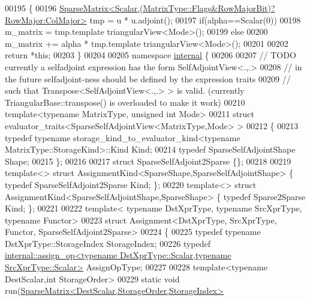 \begin{DoxyCode}
00195 \{
00196   \hyperlink{group___sparse_core___module_class_eigen_1_1_sparse_matrix}{SparseMatrix<Scalar,(MatrixType::Flags&RowMajorBit)?RowMajor:ColMajor>}
       tmp = u * u.adjoint();
00197   \textcolor{keywordflow}{if}(alpha==Scalar(0))
00198     m\_matrix = tmp.template triangularView<Mode>();
00199   \textcolor{keywordflow}{else}
00200     m\_matrix += alpha * tmp.template triangularView<Mode>();
00201 
00202   \textcolor{keywordflow}{return} *\textcolor{keyword}{this};
00203 \}
00204 
00205 \textcolor{keyword}{namespace }\hyperlink{namespaceinternal}{internal} \{
00206   
00207 \textcolor{comment}{// TODO currently a selfadjoint expression has the form SelfAdjointView<.,.>}
00208 \textcolor{comment}{//      in the future selfadjoint-ness should be defined by the expression traits}
00209 \textcolor{comment}{//      such that Transpose<SelfAdjointView<.,.> > is valid. (currently TriangularBase::transpose() is
       overloaded to make it work)}
00210 \textcolor{keyword}{template}<\textcolor{keyword}{typename} MatrixType, \textcolor{keywordtype}{unsigned} \textcolor{keywordtype}{int} Mode>
00211 \textcolor{keyword}{struct }evaluator\_traits<SparseSelfAdjointView<MatrixType,Mode> >
00212 \{
00213   \textcolor{keyword}{typedef} \textcolor{keyword}{typename} storage\_kind\_to\_evaluator\_kind<typename MatrixType::StorageKind>::Kind Kind;
00214   \textcolor{keyword}{typedef} SparseSelfAdjointShape Shape;
00215 \};
00216 
00217 \textcolor{keyword}{struct }SparseSelfAdjoint2Sparse \{\};
00218 
00219 \textcolor{keyword}{template}<> \textcolor{keyword}{struct }AssignmentKind<SparseShape,SparseSelfAdjointShape> \{ \textcolor{keyword}{typedef} SparseSelfAdjoint2Sparse 
      Kind; \};
00220 \textcolor{keyword}{template}<> \textcolor{keyword}{struct }AssignmentKind<SparseSelfAdjointShape,SparseShape> \{ \textcolor{keyword}{typedef} Sparse2Sparse Kind; \};
00221 
00222 \textcolor{keyword}{template}< \textcolor{keyword}{typename} DstXprType, \textcolor{keyword}{typename} SrcXprType, \textcolor{keyword}{typename} Functor>
00223 \textcolor{keyword}{struct }Assignment<DstXprType, SrcXprType, Functor, SparseSelfAdjoint2Sparse>
00224 \{
00225   \textcolor{keyword}{typedef} \textcolor{keyword}{typename} DstXprType::StorageIndex StorageIndex;
00226   \textcolor{keyword}{typedef} 
      \hyperlink{struct_eigen_1_1internal_1_1assign__op}{internal::assign\_op<typename DstXprType::Scalar,typename SrcXprType::Scalar>}
       AssignOpType;
00227 
00228   \textcolor{keyword}{template}<\textcolor{keyword}{typename} DestScalar,\textcolor{keywordtype}{int} StorageOrder>
00229   \textcolor{keyword}{static} \textcolor{keywordtype}{void} run(\hyperlink{group___sparse_core___module_class_eigen_1_1_sparse_matrix}{SparseMatrix<DestScalar,StorageOrder,StorageIndex>}

\end{DoxyCode}
